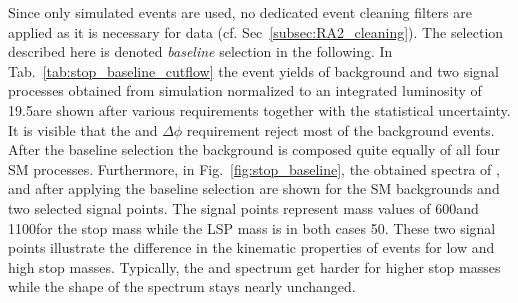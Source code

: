 Since only simulated events are used, no dedicated event cleaning filters are applied as it is necessary for data (cf. Sec~\ref{subsec:RA2_cleaning}). The selection described here is denoted \textit{baseline} selection in the following. In Tab.~\ref{tab:stop_baseline_cutflow} the event yields of background and two signal processes obtained from simulation normalized to an integrated luminosity of 19.5\fbinv are shown after various requirements together with the statistical uncertainty. It is visible that the \met and $\Delta \phi$ requirement reject most of the background events. After the baseline selection the background is composed quite equally of all four SM processes. Furthermore, in Fig.~\ref{fig:stop_baseline}, the obtained spectra of \HT, \met and \NJets after applying the baseline selection are shown for the SM backgrounds and two selected signal points. The signal points represent mass values of 600\gev and 1100\gev for the stop mass while the LSP mass is in both cases 50\gev. These two signal points illustrate the difference in the kinematic properties of events for low and high stop masses. Typically, the \HT and \met spectrum get harder for higher stop masses while the shape of the \NJets spectrum stays nearly unchanged. \\
\begin{table}[!t]
\fontsize{9 pt}{1.2 em}
\selectfont
\centering
\caption{Event yields and cut flow from MC simulated samples after various requirements described in the text. All numbers are scaled to 19.5\fbinv. Only statistical uncertainties are shown in the table. The signal points are labeled as (X, Y) where X is the top squark mass and Y is the LSP mass.}
\label{tab:stop_baseline_cutflow}
\end{table}    

